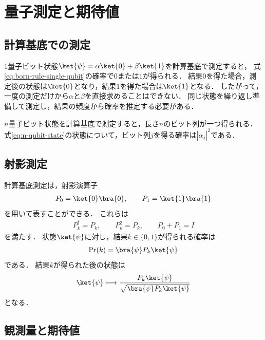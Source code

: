 \section{量子測定と期待値}
\label{sec:measurement-and-expectation}

\subsection{計算基底での測定}
\label{subsec:computational-basis-measurement}

1量子ビット状態$\ket{\psi}=\alpha\ket{0}+\beta\ket{1}$を計算基底で測定すると，
式\eqref{eq:born-rule-single-qubit}の確率で$0$または$1$が得られる．
結果$0$を得た場合，測定後の状態は$\ket{0}$となり，結果$1$を得た場合は$\ket{1}$となる．
したがって，一度の測定だけから$\alpha$と$\beta$を直接求めることはできない．
同じ状態を繰り返し準備して測定し，結果の頻度から確率を推定する必要がある．

$n$量子ビット状態を計算基底で測定すると，長さ$n$のビット列が一つ得られる．
式\eqref{eq:n-qubit-state}の状態について，ビット列$j$を得る確率は$|\alpha_j|^2$である．

\subsection{射影測定}
\label{subsec:projective-measurement}

計算基底測定は，射影演算子
\begin{align*}
  P_0=\ket{0}\bra{0},
  \qquad
  P_1=\ket{1}\bra{1}
\end{align*}
を用いて表すことができる．
これらは
\begin{align*}
  P_k^{\dagger}=P_k,
  \qquad
  P_k^2=P_k,
  \qquad
  P_0+P_1=I
\end{align*}
を満たす．
状態$\ket{\psi}$に対し，結果$k\in\{0,1\}$が得られる確率は
\begin{equation}
  \Pr(k)
  =
  \bra{\psi}P_k\ket{\psi}
  \label{eq:projective-measurement-probability}
\end{equation}
である．
結果$k$が得られた後の状態は
\begin{align*}
  \ket{\psi}
  \longmapsto
  \frac{P_k\ket{\psi}}
       {\sqrt{\bra{\psi}P_k\ket{\psi}}}
\end{align*}
となる．

\subsection{観測量と期待値}
\label{subsec:observable-and-expectation}

